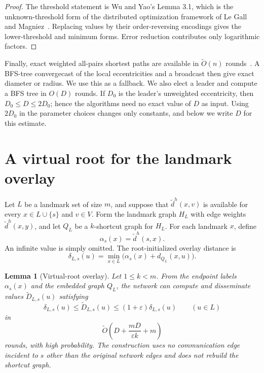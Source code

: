 \documentclass[11pt]{article}
\newtheorem{lemma}[theorem]{Lemma}
\theoremstyle{definition}
\newcommand{\eps}{\varepsilon}
\newcommand{\wtO}{\widetilde O}
\begin{document}
\begin{proof}
The threshold statement is Wu and Yao's Lemma 3.1, which is the unknown-threshold
form of the distributed optimization framework of Le Gall and
Magniez~\cite{WuYao2022,LeGallMagniez2018}.  Replacing values by their
order-reversing encodings gives the lower-threshold and minimum forms.  Error
reduction contributes only logarithmic factors.
\end{proof}

Finally, exact weighted all-pairs shortest paths are available in
$\wtO(n)$ rounds~\cite{BernsteinNanongkai2019}.  A BFS-tree convergecast of
the local eccentricities and a broadcast then give exact diameter or radius.
We use this as a fallback.  We also elect a leader and compute a BFS tree in
$O(D)$ rounds.  If $D_0$ is the leader's unweighted eccentricity, then
$D_0\leq D\leq2D_0$; hence the algorithms need no exact value of $D$ as input.
Using $2D_0$ in the parameter choices changes only constants, and below we
write $D$ for this estimate.

\section{A virtual root for the landmark overlay}
\label{sec:virtual-root}

Let $L$ be a landmark set of size $m$, and suppose that
$\widetilde d^h(x,v)$ is available for every $x\in L\cup\{s\}$ and
$v\in V$.  Form the landmark graph $H_L$ with edge weights
$\widetilde d^h(x,y)$, and let $Q_L$ be a $k$-shortcut graph for $H_L$.
For each landmark $x$, define
\[
  \alpha_s(x)=\widetilde d^h(s,x).
\]
An infinite value is simply omitted.  The root-initialized overlay distance is
\[
  \delta_{L,s}(u)
  =\min_{x\in L}\bigl(\alpha_s(x)+d_{Q_L}(x,u)\bigr).
  \tag{4}\label{eq:root-overlay-distance}
\]

\begin{lemma}[Virtual-root overlay]
\label{lem:virtual-root}
Let $1\leq k<m$.  From the endpoint labels $\alpha_s(x)$ and the embedded
graph $Q_L$, the network can compute and disseminate values
$\widetilde D_{L,s}(u)$ satisfying
\[
  \delta_{L,s}(u)
  \leq \widetilde D_{L,s}(u)
  \leq(1+\eps)\delta_{L,s}(u)
  \qquad(u\in L)
  \tag{5}\label{eq:virtual-root-guarantee}
\]
in
\[
  \wtO\!\left(D+\frac{mD}{\eps k}+m\right)
  \tag{6}\label{eq:virtual-root-cost}
\]
rounds, with high probability.  The construction uses no communication edge
incident to $s$ other than the original network edges and does not rebuild the
shortcut graph.
\end{lemma}
\end{document}
